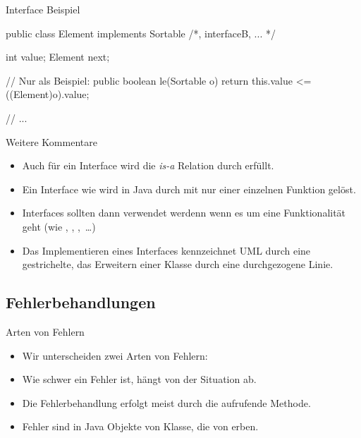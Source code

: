 \begin{frame}[fragile,c]{Interface Beispiel}
\begin{plainjava}
public class Element implements Sortable /*, interfaceB, ... */ {
    int value;
    Element next;

    // Nur als Beispiel:
    public boolean le(Sortable o) {
        return this.value <= ((Element)o).value;
    }

    // ...
}
\end{plainjava}
\end{frame}

\begin{frame}{Weitere Kommentare}
    \begin{itemize}[<+(1)->]
        \widei
        \item Auch für ein Interface wird die \emph{is-a} Relation durch  erfüllt.
        \item Ein Interface wie  wird in Java durch  mit nur einer einzelnen Funktion  gelöst.
        \item Interfaces sollten dann verwendet werdenn wenn es um eine Funktionalität geht (wie , , ,~\ldots)
        \item Das Implementieren eines Interfaces kennzeichnet UML durch eine gestrichelte, das Erweitern einer Klasse durch eine durchgezogene Linie.
    \end{itemize}
\end{frame}

\subsection{Fehlerbehandlungen}
\begin{frame}{Arten von Fehlern}
    \begin{itemize}[<+(1)->]
        \widei
        \item Wir unterscheiden zwei Arten von Fehlern: 
        \item Wie schwer ein Fehler ist, hängt von der Situation ab.
        \item Die Fehlerbehandlung erfolgt meist durch die aufrufende Methode.
        \item Fehler sind in Java Objekte von Klasse,\pause{} die von  erben.
    \end{itemize}
\end{frame}

